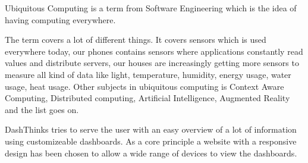 Ubiquitous Computing is a term from Software Engineering which is the idea of having
computing everywhere.

The term covers a lot of different things. It covers sensors which is used everywhere today,
our phones contains sensors where applications constantly read values and distribute servers,
our houses are increasingly getting more sensors to measure all kind of data like light,
temperature, humidity, energy usage, water usage, heat usage.
Other subjects in ubiquitous computing is Context Aware Computing, Distributed computing,
Artificial Intelligence, Augmented Reality and the list goes on.

DashThinks tries to serve the user with an easy overview of a lot of information using
customizeable dashboards. As a core principle a website with a responsive design has been
chosen to allow a wide range of devices to view the dashboards. 